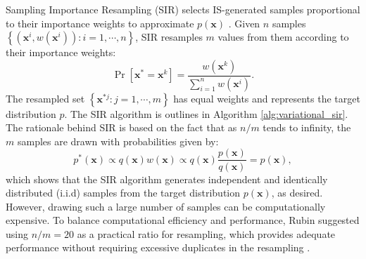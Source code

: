 \documentclass[pdflatex,sn-mathphys-num]{sn-jnl}%
\theoremstyle{thmstyleone}%
\theoremstyle{thmstyletwo}%
\theoremstyle{thmstylethree}%
\begin{document}
Sampling Importance Resampling (SIR) selects IS-generated samples proportional to their importance weights to approximate $p\left(\mathbf{x}\right)$ \cite{rubin1987calculation, db1988using}. Given $n$ samples $\left\{ \left(\mathbf{x}^{i}, w\left(\mathbf{x}^{i}\right)\right): i=1,\cdots,n\right\}$, SIR resamples $m$ values from them according to their importance weights:
\begin{equation}
    \operatorname{Pr}\left[\mathbf{x}^{*} = \mathbf{x}^{k}\right] = \frac{w\left(\mathbf{x}^{k}\right)}{\sum_{i=1}^{n}w\left(\mathbf{x}^{i}\right)}.
\end{equation}
The resampled set $\left\{\mathbf{x}^{*j}: j=1,\cdots,m\right\}$ has equal weights and represents the target distribution $p$. The SIR algorithm is outlines in Algorithm \ref{alg:variational_sir}. The rationale behind SIR is based on the fact that as $n/m$ tends to infinity, the $m$ samples are drawn with probabilities given by:
$$p^*\left(\mathbf{x}\right) \propto q\left(\mathbf{x}\right)w\left(\mathbf{x}\right) \propto q\left(\mathbf{x}\right)\frac{p\left(\mathbf{x}\right)}{q\left(\mathbf{x}\right)} = p\left(\mathbf{x}\right),$$
which shows that the SIR algorithm generates independent and identically distributed (i.i.d) samples from the target distribution $p\left(\mathbf{x}\right)$, as desired. However, drawing such a large number of samples can be computationally expensive. To balance computational efficiency and performance, Rubin suggested using $n/m=20$ as a practical ratio for resampling, which provides adequate performance without requiring excessive duplicates in the resampling \cite{rubin1987calculation}.
\end{document}
